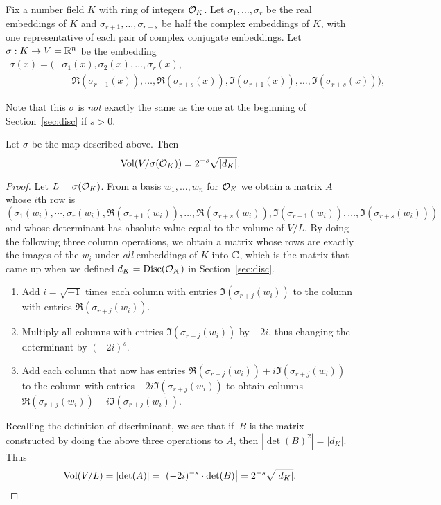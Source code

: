 Fix a number field $K$ with ring of integers $\mathcal{O}_K$.
Let $\sigma_1,\ldots, \sigma_r$ be the real embeddings
of $K$ and $\sigma_{r+1},\ldots, \sigma_{r+s}$ be half
the complex embeddings of $K$, with one representative of
each pair of complex conjugate embeddings.
Let $\sigma:K \to V=\mathbb{R}^n$ be the embedding
\begin{align*}
  \sigma(x) = \big(&\sigma_1(x), \sigma_2(x),\ldots, \sigma_r(x),\\
     &\quad \Re(\sigma_{r+1}(x)), \ldots, \Re(\sigma_{r+s}(x)),
      \Im(\sigma_{r+1}(x)), \ldots, \Im(\sigma_{r+s}(x))\big),
\end{align*}
\begin{warning}
Note that this $\sigma$ is {\em not} exactly the same as the one
at the beginning of Section~\ref{sec:disc} if $s>0$.
\end{warning}
\begin{lemma}\label{lem:volok}
Let $\sigma$ be the map described above. Then
\[
  \operatorname{Vol}(V/\sigma(\mathcal{O}_K)) = 2^{-s} \sqrt{\left|d_K\right|}.
\]
\end{lemma}
\begin{proof}
Let $L=\sigma(\mathcal{O}_K)$.
From a basis $w_1,\ldots, w_n$ for $\mathcal{O}_K$ we obtain a matrix $A$
whose $i$th row is
\[
(\sigma_1(w_i), \cdots, \sigma_r(w_i),
\Re(\sigma_{r+1}(w_i)),\ldots, \Re(\sigma_{r+s}(w_i)),
\Im(\sigma_{r+1}(w_i)),\ldots, \Im(\sigma_{r+s}(w_i)))
\]
and whose determinant has absolute value equal to the volume
of $V/L$.  By doing the following three column operations,
we obtain a matrix whose rows are exactly the images of
the $w_i$ under {\em all} embeddings of $K$ into $\mathbb{C}$, which
is the matrix that came up when we defined
$d_K=\operatorname{Disc}(\mathcal{O}_K)$ in Section~\ref{sec:disc}.
\begin{enumerate}
\item Add $i=\sqrt{-1}$ times each column with entries $\Im(\sigma_{r+j}(w_i))$
to the column with entries $\Re(\sigma_{r+j}(w_i))$.
\item Multiply all columns with entries $\Im(\sigma_{r+j}(w_i))$
  by $-2i$, thus changing the determinant by $(-2i)^s$.
\item Add each column that now has entries
$\Re(\sigma_{r+j}(w_i))+i\Im(\sigma_{r+j}(w_i))$
to the column with entries $-2i\Im(\sigma_{r+j}(w_i))$
to obtain columns $\Re(\sigma_{r+j}(w_i))-i\Im(\sigma_{r+j}(w_i))$.
\end{enumerate}
Recalling the definition of discriminant, we see that if~$B$
is the matrix constructed by doing the above three
operations to $A$, then $\left|\det(B)^2\right| = \left|d_K\right|$.
Thus
\[
  \operatorname{Vol}(V/L) = \left|\det(A)\right| = \left|(-2i)^{-s}\cdot \det(B)\right| = 2^{-s}\sqrt{\left|d_K\right|}.
\]
\end{proof}

